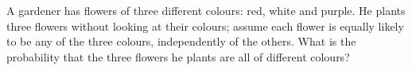 A gardener has flowers of three different colours: red, white and purple. He plants three flowers without looking at their colours; assume each flower is equally likely to be any of the three colours, independently of the others. What is the probability that the three flowers he plants are all of different colours?
